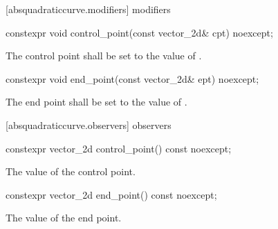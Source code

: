  [absquadraticcurve.modifiers]{ modifiers}

\begin{itemdecl}
constexpr void control_point(const vector_2d& cpt) noexcept;
\end{itemdecl}
\begin{itemdescr}
\pnum
\effects
The control point shall be set to the value of .
\end{itemdescr}

\begin{itemdecl}
constexpr void end_point(const vector_2d& ept) noexcept;
\end{itemdecl}
\begin{itemdescr}
\pnum
\effects
The end point shall be set to the value of .
\end{itemdescr}

 [absquadraticcurve.observers]{ observers}

\begin{itemdecl}
constexpr vector_2d control_point() const noexcept;
\end{itemdecl}
\begin{itemdescr}
\pnum
\returns
The value of the control point.
\end{itemdescr}

\begin{itemdecl}
constexpr vector_2d end_point() const noexcept;
\end{itemdecl}
\begin{itemdescr}
\pnum
\returns
The value of the end point.
\end{itemdescr}
